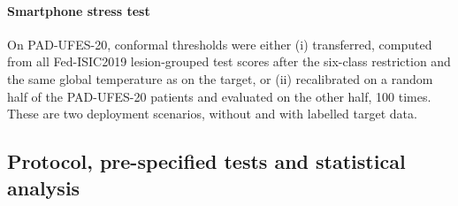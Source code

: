 \documentclass[VANCOUVER,Times1COL]{WileyNJDv5}
\begin{document}
\paragraph{Smartphone stress test} On PAD-UFES-20, conformal thresholds were either (i) transferred,
computed from all Fed-ISIC2019 lesion-grouped test scores after the six-class restriction and the same
global temperature as on the target, or (ii) recalibrated on a random half of the PAD-UFES-20 patients and
evaluated on the other half, 100 times. These are two deployment scenarios, without and with labelled
target data.

\subsection{Protocol, pre-specified tests and statistical analysis}
\label{sec:prereg}
\end{document}
